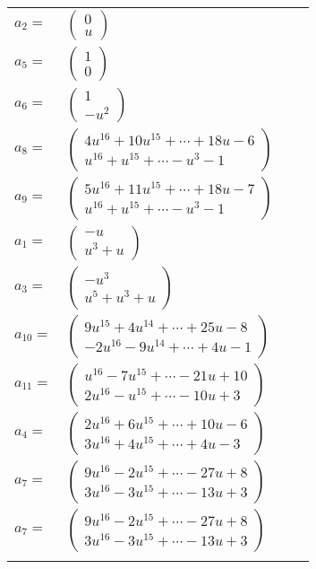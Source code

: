 \documentclass[1p]{elsarticle_modified}
\theoremstyle{definition}
\begin{document}
\begin{tabular}{m{7pt} m{180pt} m{7pt} m{180pt} }
\flushright $a_{2}=$&$\begin{pmatrix}0\\u\end{pmatrix}$ \\
\flushright $a_{5}=$&$\begin{pmatrix}1\\0\end{pmatrix}$ \\
\flushright $a_{6}=$&$\begin{pmatrix}1\\- u^2\end{pmatrix}$ \\
\flushright $a_{8}=$&$\begin{pmatrix}4 u^{16}+10 u^{15}+\cdots+18 u-6\\u^{16}+u^{15}+\cdots- u^3-1\end{pmatrix}$ \\
\flushright $a_{9}=$&$\begin{pmatrix}5 u^{16}+11 u^{15}+\cdots+18 u-7\\u^{16}+u^{15}+\cdots- u^3-1\end{pmatrix}$ \\
\flushright $a_{1}=$&$\begin{pmatrix}- u\\u^3+u\end{pmatrix}$ \\
\flushright $a_{3}=$&$\begin{pmatrix}- u^3\\u^5+u^3+u\end{pmatrix}$ \\
\flushright $a_{10}=$&$\begin{pmatrix}9 u^{15}+4 u^{14}+\cdots+25 u-8\\-2 u^{16}-9 u^{14}+\cdots+4 u-1\end{pmatrix}$ \\
\flushright $a_{11}=$&$\begin{pmatrix}u^{16}-7 u^{15}+\cdots-21 u+10\\2 u^{16}- u^{15}+\cdots-10 u+3\end{pmatrix}$ \\
\flushright $a_{4}=$&$\begin{pmatrix}2 u^{16}+6 u^{15}+\cdots+10 u-6\\3 u^{16}+4 u^{15}+\cdots+4 u-3\end{pmatrix}$ \\
\flushright $a_{7}=$&$\begin{pmatrix}9 u^{16}-2 u^{15}+\cdots-27 u+8\\3 u^{16}-3 u^{15}+\cdots-13 u+3\end{pmatrix}$\\ \flushright $a_{7}=$&$\begin{pmatrix}9 u^{16}-2 u^{15}+\cdots-27 u+8\\3 u^{16}-3 u^{15}+\cdots-13 u+3\end{pmatrix}$\\&\end{tabular}
\end{document}
